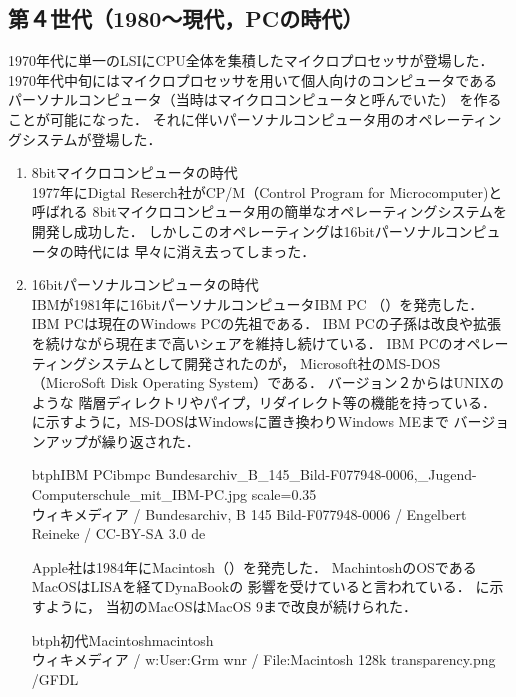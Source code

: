 \subsection{第４世代（1980〜現代，PCの時代）}

1970年代に単一のLSIにCPU全体を集積したマイクロプロセッサが登場した．
1970年代中旬にはマイクロプロセッサを用いて個人向けのコンピュータである
パーソナルコンピュータ（当時はマイクロコンピュータと呼んでいた）
を作ることが可能になった．
それに伴いパーソナルコンピュータ用のオペレーティングシステムが登場した．

\begin{enumerate}
\item 8bitマイクロコンピュータの時代 \\
1977年にDigtal Reserch社がCP/M（Control Program for Microcomputer)と呼ばれる
8bitマイクロコンピュータ用の簡単なオペレーティングシステムを
開発し成功した．
しかしこのオペレーティングは16bitパーソナルコンピュータの時代には
早々に消え去ってしまった\cite{fourth}．

\item 16bitパーソナルコンピュータの時代 \\
IBMが1981年に16bitパーソナルコンピュータIBM PC\cite{ibmpc81}
（）を発売した．
IBM PCは現在のWindows PCの先祖である．
IBM PCの子孫は改良や拡張を続けながら現在まで高いシェアを維持し続けている．
IBM PCのオペレーティングシステムとして開発されたのが，
Microsoft社のMS-DOS（MicroSoft Disk Operating System）\cite{msdos}である．
バージョン２からはUNIXのような
階層ディレクトリやパイプ，リダイレクト等の機能を持っている．
に示すように，MS-DOSはWindowsに置き換わりWindows MEまで
バージョンアップが繰り返された．

\begin{myfig}{btph}{IBM PC}{ibmpc}
\myincludegraphics
{Bundesarchiv_B_145_Bild-F077948-0006,_Jugend-Computerschule_mit_IBM-PC.jpg}
{scale=0.35}\\
{\small
ウィキメディア /
Bundesarchiv, B 145 Bild-F077948-0006 / Engelbert Reineke / CC-BY-SA 3.0 de}
\end{myfig}

Apple社は1984年にMacintosh（）を発売した．
MachintoshのOSであるMacOSはLISAを経てDynaBook\cite{key72, key72J}の
影響を受けていると言われている\cite{fourth}．
に示すように，
当初のMacOSはMacOS 9\cite{classicmacos}まで改良が続けられた．

\begin{myfig}{btph}{初代Macintosh}{macintosh}
\\
{\small
ウィキメディア / w:User:Grm wnr / File:Macintosh 128k transparency.png /GFDL}
\end{myfig}


\end{enumerate}
